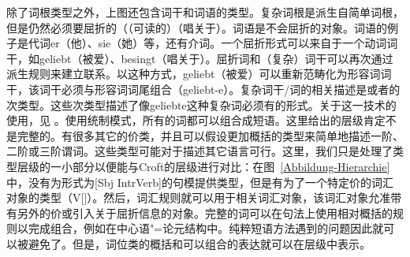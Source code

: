 除了词根类型之外，上图还包含词干和词语的类型。复杂词根是派生自简单词根，但是仍然必须要屈折的（（可读的）（唱关于）。词语是不会屈折的对象。词语的例子是代词er（他）、sie（她）等，还有介词。一个屈折形式可以来自于一个动词词干，如geliebt（被爱）、besingt（唱关于）。屈折词和（复杂）词干可以再次通过派生规则来建立联系。以这种方式，geliebt（被爱）可以重新范畴化为形容词词干，该词干必须与形容词词尾组合（geliebt-e）。复杂词干/词的相关描述是或者的次类型。这些次类型描述了像geliebte这种复杂词必须有的形式。关于这一技术的使用，见 。使用统制模式，所有的词都可以组合成短语。这里给出的层级肯定不是完整的。有很多其它的价类，并且可以假设更加概括的类型来简单地描述一阶、二阶或三阶谓词。这些类型可能对于描述其它语言可行。这里，我们只是处理了类型层级的一小部分以便能与Croft的层级进行对比：在图~\ref{Abbildung-Hierarchie}中，没有为形式为[Sbj IntrVerb]的句模提供类型，但是有为了一个特定价的词汇对象的类型（V[\subcat {}]）。然后，词汇规则就可以用于相关词汇对象，该词汇对象允准带有另外的价或引入关于屈折信息的对象。完整的词可以在句法上使用相对概括的规则以完成组合，例如在中心语"=论元结构中。纯粹短语方法遇到的问题因此就可以被避免了。但是，词位类的概括和可以组合的表达就可以在层级中表示。
